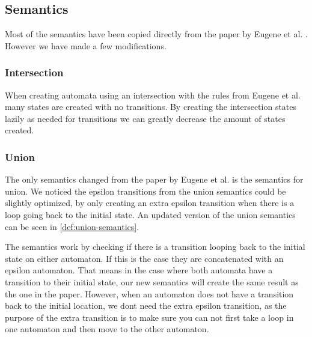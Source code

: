 \subsection{Semantics}
\begin{comment}
    Where do most of our semantics come from?
    
    Intersection semantics
     - Motivation

    Describe union semantics
     - Motivation
     - New definition
     - Visual change
    
    Describe MatchAny semantics
     - Motivation
     - Definition
     - Visual
\end{comment}

Most of the semantics have been copied directly from the paper by Eugene et al. \cite{Eugene2001}. However we have made a few modifications.

\subsubsection{Intersection}
When creating automata using an intersection with the rules from Eugene et al.
many states are created with no transitions.
By creating the intersection states lazily as needed for transitions we can greatly decrease the amount of states created.

\subsubsection{Union}
The only semantics changed from the paper by Eugene et al. is the semantics for union. We noticed the epsilon transitions from the union semantics could be slightly optimized, by only creating an extra epsilon transition when there is a loop going back to the initial state. An updated version of the union semantics can be seen in \cref{def:union-semantics}.



The semantics work by checking if there is a transition looping back to the initial state on either automaton. If this is the case they are concatenated with an epsilon automaton. That means in the case where both automata have a transition to their initial state, our new semantics will create the same result as the one in the paper. However, when an automaton does not have a transition back to the initial location, we dont need the extra epsilon transition, as the purpose of the extra transition is to make sure you can not first take a loop in one automaton and then move to the other automaton.


